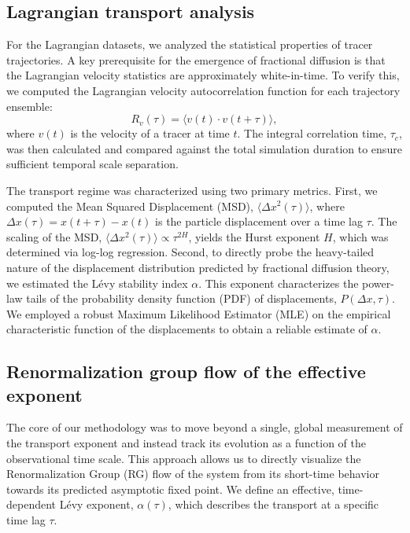 \documentclass[]{article}
\begin{document}
\subsection{Lagrangian transport analysis}
For the Lagrangian datasets, we analyzed the statistical properties of tracer trajectories. A key prerequisite for the emergence of fractional diffusion is that the Lagrangian velocity statistics are approximately white-in-time. To verify this, we computed the Lagrangian velocity autocorrelation function for each trajectory ensemble:
\begin{equation}
R_v(\tau) = \langle v(t) \cdot v(t+\tau) \rangle,
\end{equation}
where $v(t)$ is the velocity of a tracer at time $t$. The integral correlation time, $\tau_c$, was then calculated and compared against the total simulation duration to ensure sufficient temporal scale separation.

The transport regime was characterized using two primary metrics. First, we computed the Mean Squared Displacement (MSD), $\langle \Delta x^2(\tau) \rangle$, where $\Delta x(\tau) = x(t+\tau) - x(t)$ is the particle displacement over a time lag $\tau$. The scaling of the MSD, $\langle \Delta x^2(\tau) \rangle \propto \tau^{2H}$, yields the Hurst exponent $H$, which was determined via log-log regression. Second, to directly probe the heavy-tailed nature of the displacement distribution predicted by fractional diffusion theory, we estimated the Lévy stability index $\alpha$. This exponent characterizes the power-law tails of the probability density function (PDF) of displacements, $P(\Delta x, \tau)$. We employed a robust Maximum Likelihood Estimator (MLE) on the empirical characteristic function of the displacements to obtain a reliable estimate of $\alpha$.

\subsection{Renormalization group flow of the effective exponent}
The core of our methodology was to move beyond a single, global measurement of the transport exponent and instead track its evolution as a function of the observational time scale. This approach allows us to directly visualize the Renormalization Group (RG) flow of the system from its short-time behavior towards its predicted asymptotic fixed point. We define an effective, time-dependent Lévy exponent, $\alpha(\tau)$, which describes the transport at a specific time lag $\tau$.
\end{document}
